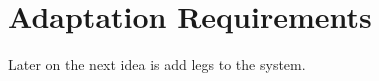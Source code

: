 \KNEADSECTIONNEWPAGE
\section{Adaptation Requirements}
\label{lab:sec_Adaptation}
% 

Later on the next idea is add legs to the system.